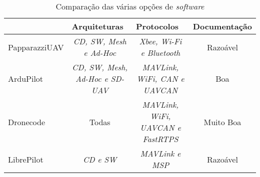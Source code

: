 \begin{table}[H]
\caption{Comparação das várias opções de \textit{software}}
\begin{tabular}{l|c|c|c|}
\cline{2-4}
& \multicolumn{1}{l|}{Arquiteturas}  & \multicolumn{1}{l|}{Protocolos}  & \multicolumn{1}{l|}{Documentação} \\ \hline
\multicolumn{1}{|l|}{PapparazziUAV} & \textit{CD, SW, Mesh e Ad-Hoc}  & \textit{Xbee, Wi-Fi e Bluetooth} & Razoável \\ \hline
\multicolumn{1}{|l|}{ArduPilot}     & \textit{CD, SW, Mesh, Ad-Hoc e SD-UAV} & \textit{MAVLink, WiFi, CAN e UAVCAN}      & Boa                               \\ \hline
\multicolumn{1}{|l|}{Dronecode}     & Todas                                  & \textit{MAVLink, WiFi, UAVCAN e FastRTPS} & Muito Boa                         \\ \hline
\multicolumn{1}{|l|}{LibrePilot}    & \textit{CD e SW}                       & \textit{MAVLink e MSP}                    & Razoável                          \\ \hline
\end{tabular}
\end{table}




